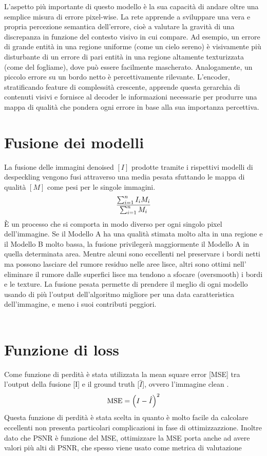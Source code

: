 L’aspetto più importante di questo modello è la sua capacità di andare oltre una semplice misura di errore pixel-wise. 
La rete apprende a sviluppare una vera e propria percezione semantica dell’errore, cioè a valutare la gravità di una 
discrepanza in funzione del contesto visivo in cui compare. Ad esempio, un errore di grande entità in una regione 
uniforme (come un cielo sereno) è visivamente più disturbante di un errore di pari entità in una regione altamente 
texturizzata (come del fogliame), dove può essere facilmente mascherato. Analogamente, un piccolo errore su un bordo 
netto è percettivamente rilevante. L’encoder, stratificando feature di complessità crescente, apprende questa gerarchia 
di contenuti visivi e fornisce al decoder le informazioni necessarie per produrre una mappa di qualità che pondera 
ogni errore in base alla sua importanza percettiva.

\section{Fusione dei modelli}
La fusione delle immagini denoised $[I]$ prodotte tramite i rispettivi modelli di despeckling vengono fusi attraverso una media pesata sfuttando
le mappa di qualità $[M]$ come pesi per le singole immagini.
\begin{equation}
    \makebox[\textwidth][c]{%
      $\displaystyle
        \frac{\sum_{i=1}^{n} I_i M_i}{\sum_{i=1}^{n} M_i}
      $%
    }
\end{equation}
È un processo che si comporta in modo diverso per ogni singolo pixel dell'immagine. Se il Modello A ha una qualità stimata 
molto alta in una regione e il Modello B molto bassa, la fusione privilegerà maggiormente 
il Modello A in quella determinata area. Mentre alcuni sono eccellenti nel preservare i bordi netti ma possono lasciare del rumore residuo nelle aree lisce, 
altri sono ottimi nell' eliminare il rumore dalle superfici lisce ma tendono a sfocare (oversmooth) i bordi e le texture.
La fusione pesata permette di prendere il meglio di ogni modello usando di più l'output dell'algoritmo migliore per una data 
caratteristica dell'immagine, e meno i suoi contributi peggiori.
\\\\
\section{Funzione di loss}
Come funzione di perdità è stata utilizzata la mean square error [MSE] tra l'output della fusione [I] 
e il ground truth [$\hat{I}$], ovvero l'immagine clean . 
\begin{equation}
  \makebox[\textwidth][c]{%
    $\displaystyle
    \text{MSE} = \left( I - \hat{I} \right)^2
    $%
  }
\end{equation}
Questa funzione di perdità è stata scelta in quanto è molto facile da calcolare eccellenti 
non presenta particolari complicazioni in fase di ottimizzazzione. Inoltre 
dato che PSNR è funzione del MSE, ottimizzare la MSE porta anche ad avere valori 
più alti di PSNR, che spesso viene usato come metrica di valutazione 


